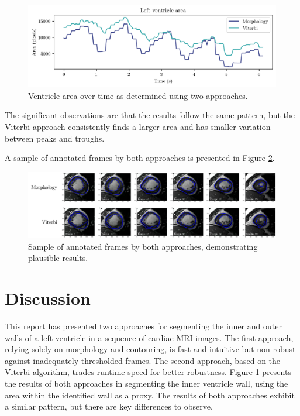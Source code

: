 \begin{figure}[ht]
  \centering
  \includegraphics[width=\textwidth]{images/q1_ventricle_area.png}
  \caption{Ventricle area over time as determined using two approaches.}
  \label{fig:ventricle_area}
\end{figure}

The significant observations are that the results follow the same pattern, but the Viterbi approach consistently finds a larger area and has smaller variation between peaks and troughs.

A sample of annotated frames by both approaches is presented in Figure \ref{fig:annotated_frames}.

\begin{figure}[ht]
  \centering
  \includegraphics[width=\textwidth]{images/q1_annotated_frames.png}
  \caption{Sample of annotated frames by both approaches, demonstrating plausible results.}
  \label{fig:annotated_frames}
\end{figure}

\newpage
\section{Discussion}

This report has presented two approaches for segmenting the inner and outer walls of a left ventricle in a sequence of cardiac MRI images. The first approach, relying solely on morphology and contouring, is fast and intuitive but non-robust against inadequately thresholded frames. The second approach, based on the Viterbi algorithm, trades runtime speed for better robustness. Figure \ref{fig:ventricle_area} presents the results of both approaches in segmenting the inner ventricle wall, using the area within the identified wall as a proxy. The results of both approaches exhibit a similar pattern, but there are key differences to observe.

